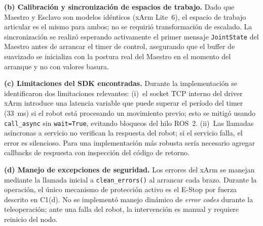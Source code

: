 \documentclass[journal,10pt,twoside]{IEEEtran}
\begin{document}
\textbf{(b) Calibración y sincronización de espacios de trabajo.}
Dado que Maestro y Esclavo son modelos idénticos (xArm Lite~6),
el espacio de trabajo articular es el mismo para ambos; no se
requirió transformación de escalado. La sincronización se realizó
esperando activamente el primer mensaje \texttt{JointState} del
Maestro antes de arrancar el timer de control, asegurando que el
buffer de suavizado se inicializa con la postura real del Maestro
en el momento del arranque y no con valores basura.

\textbf{(c) Limitaciones del SDK encontradas.}
Durante la implementación se identificaron dos limitaciones
relevantes: (i)~el socket TCP interno del driver xArm introduce
una latencia variable que puede superar el período del timer
(33~ms) si el robot está procesando un movimiento previo; esto se
mitigó usando \texttt{call\_async} sin \texttt{wait=True}, evitando
bloqueos del hilo ROS~2. (ii)~Las llamadas asíncronas a servicio
no verifican la respuesta del robot; si el servicio falla, el
error es silencioso. Para una implementación más robusta sería
necesario agregar callbacks de respuesta con inspección del código
de retorno.

\textbf{(d) Manejo de excepciones de seguridad.}
Los errores del xArm se manejan mediante la llamada inicial a
\texttt{clean\_errors()} al arrancar cada brazo. Durante la
operación, el único mecanismo de protección activo es el E-Stop
por fuerza descrito en C1(d). No se implementó manejo dinámico
de \textit{error codes} durante la teleoperación; ante una falla
del robot, la intervención es manual y requiere reinicio del nodo.
\end{document}
